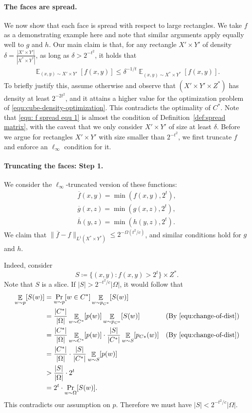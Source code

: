 \documentclass[11pt]{article}
\DeclareMathOperator*{\E}{\mathbb{E}}
\newcommand{\1}{ \mathbbm{1}}
\begin{document}
\paragraph*{The faces are spread.} We now show that each face is spread with respect to large rectangles. We take $f$ as a demonstrating example here and note that similar arguments apply equally well to $g$ and $h$. Our main claim is that, for any rectangle $X'\times Y'$ of density $\delta = \frac{|X'\times Y'|}{|X^*\times Y^*|}$, as long as $\delta > 2^{-t^2}$, it holds that
\begin{align}
\E_{(x,y)\sim X'\times Y'}[f(x,y)] \le \delta^{-1/t} \E_{(x,y)\sim X^*\times Y^*}[ f(x,y)] . \label{equ: f spread equ 1}
\end{align}
To briefly justify this, assume otherwise and observe that $(X'\times Y'\times Z^*)$ has density at least $2^{-2t^2}$, and it attains a higher value for the optimization problem of \eqref{equ:cube-density-optimization}. This contradicts the optimality of $C^*$. Note that \eqref{equ: f spread equ 1} is almost the condition of Definition~\ref{def:spread matrix}, with the caveat that we only consider $X'\times Y'$ of size at least $\delta$. Before we argue for rectangles $X'\times Y'$ with size smaller than $2^{-t^2}$, we first truncate $f$ and enforce an $\ell_{\infty}$ condition for it.

\paragraph*{Truncating the faces: Step 1.}
We consider the $\ell_{\infty}$-truncated version of these functions:
$$
\begin{aligned}
\overline{f}(x,y) = \min(f(x,y), 2^{t}), \\
\overline{g}(x,z) = \min(g(x,z), 2^{t}), \\
\overline{h}(y,z) = \min(h(y,z), 2^{t}).
\end{aligned}
$$
We claim that $\| \overline{f} - f \|_{L^1(X^*\times Y^*)} \le 2^{-\Omega(t^2/c)}$, and similar conditions hold for $g$ and $h$.

Indeed, consider
$$
S \coloneqq \{ (x,y): f(x,y) > 2^{t}\} \times Z^*.
$$
Note that $S$ is a slice. If $|S| > 2^{-t^2/c}|\Omega|$, it would follow that
$$
\begin{aligned}
\E_{w\sim p}[S(w)] 
&= \Pr_{w\sim p}[w\in C^*] \E_{w\sim p_{C^*}}[S(w)] \\
&= \frac{|C^*|}{|\Omega|} \E_{w\sim C^*}[p(w)] \E_{w\sim p_{C^*}}[S(w)] & \text{(By \eqref{equ:change-of-dist})} \\
&= \frac{|C^*|}{|\Omega|} \E_{w\sim C^*}[p(w)] \cdot \frac{|S|}{|C^*|} \E_{w\sim S}[p_{C*}(w)]  & \text{(By \eqref{equ:change-of-dist})} \\
&= \frac{|C^*|}{|\Omega|} \cdot \frac{|S|}{|C^*|} \E_{w\sim S}[p(w)]  \\
&> \frac{|S|}{|\Omega|} \cdot 2^t \\
&= 2^t\cdot \Pr_{w\sim \Omega}[S(w)].
\end{aligned}
$$
This contradicts our assumption on $p$. Therefore we must have $|S| < 2^{-t^2/c}|\Omega|$. 
\end{document}
